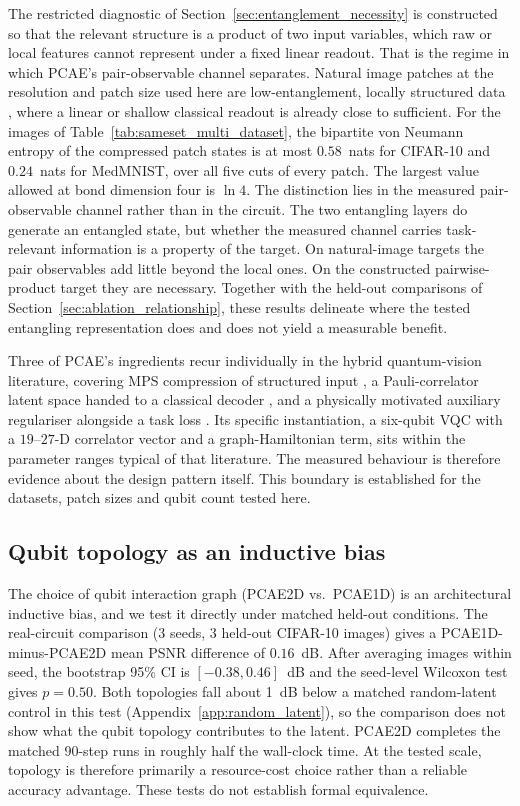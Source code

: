 \documentclass[pdflatex,sn-basic]{sn-jnl}
\begin{document}
The restricted diagnostic of Section~\ref{sec:entanglement_necessity} is constructed so that the relevant structure is a product of two input variables, which raw or local features cannot represent under a fixed linear readout.
That is the regime in which PCAE's pair-observable channel separates.
Natural image patches at the resolution and patch size used here are low-entanglement, locally structured data \citep{Martyn2020, Lu2025}, where a linear or shallow classical readout is already close to sufficient.
For the images of Table~\ref{tab:sameset_multi_dataset}, the bipartite von Neumann entropy of the compressed patch states is at most $0.58$~nats for CIFAR-10 and $0.24$~nats for MedMNIST, over all five cuts of every patch.
The largest value allowed at bond dimension four is $\ln 4$.
The distinction lies in the measured pair-observable channel rather than in the circuit.
The two entangling layers do generate an entangled state, but whether the measured channel carries task-relevant information is a property of the target.
On natural-image targets the pair observables add little beyond the local ones.
On the constructed pairwise-product target they are necessary.
Together with the held-out comparisons of Section~\ref{sec:ablation_relationship}, these results delineate where the tested entangling representation does and does not yield a measurable benefit.

Three of PCAE's ingredients recur individually in the hybrid quantum-vision literature, covering MPS compression of structured input \citep{Stoudenmire2016, Han2018, Cirac2021, Guala2023}, a Pauli-correlator latent space handed to a classical decoder \citep{Havlicek2019}, and a physically motivated auxiliary regulariser alongside a task loss \citep{Shi2022}.
Its specific instantiation, a six-qubit VQC with a $19$--$27$-D correlator vector and a graph-Hamiltonian term, sits within the parameter ranges typical of that literature.
The measured behaviour is therefore evidence about the design pattern itself.
This boundary is established for the datasets, patch sizes and qubit count tested here.

\subsection{Qubit topology as an inductive bias}
\label{sec:topology}

The choice of qubit interaction graph (PCAE2D vs.\ PCAE1D) is an architectural inductive bias, and we test it directly under matched held-out conditions.
The real-circuit comparison (3 seeds, 3 held-out CIFAR-10 images) gives a PCAE1D-minus-PCAE2D mean PSNR difference of $0.16$~dB.
After averaging images within seed, the bootstrap 95\% CI is $[-0.38,0.46]$~dB and the seed-level Wilcoxon test gives $p=0.50$.
Both topologies fall about 1~dB below a matched random-latent control in this test (Appendix~\ref{app:random_latent}), so the comparison does not show what the qubit topology contributes to the latent.
PCAE2D completes the matched 90-step runs in roughly half the wall-clock time.
At the tested scale, topology is therefore primarily a resource-cost choice rather than a reliable accuracy advantage.
These tests do not establish formal equivalence.
\end{document}
